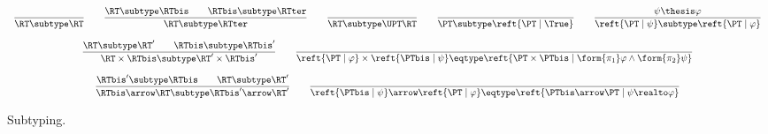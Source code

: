 \begin{figure}[t!]
\centering
\(
\begin{array}{c}
%
\dfrac{}
  {\RT \subtype \RT}
%
\qquad
%
\dfrac{\RT \subtype \RTbis
  \qquad
  \RTbis \subtype \RTter}
  {\RT \subtype \RTter}
%
\qquad
%
\dfrac{}
  {\RT \subtype \UPT\RT}
%
\qquad
%
\dfrac{}
  {\PT \subtype \reft{\PT \mid \True}}
%
\qquad
%
\dfrac{\psi \thesis \varphi}
  {\reft{\PT \mid \psi} \subtype \reft{\PT \mid \varphi}}
%
\\\\
%
\dfrac{\RT \subtype \RT'
  \qquad
  \RTbis \subtype \RTbis'}
  {\RT \times \RTbis \subtype \RT' \times \RTbis'}
%
\qquad
%
\dfrac{}{
  \reft{\PT \mid \varphi}
  \times
  \reft{\PTbis \mid \psi}
  \eqtype
  \reft{\PT \times \PTbis \mid \form{\pi_1}\varphi \land \form{\pi_2}\psi}}
%
\\\\
%
\dfrac{\RTbis' \subtype \RTbis
  \qquad
  \RT \subtype \RT'}
  {\RTbis \arrow \RT \subtype \RTbis' \arrow \RT'}
%
%
\qquad
%
\dfrac{}
  {\reft{\PTbis \mid \psi} \arrow \reft{\PT \mid \varphi}
  \eqtype
  \reft{\PTbis \arrow \PT \mid \psi \realto \varphi}}
%
% 
% 
% 
%
\end{array}
\)

\caption{Subtyping.%
\label{fig:reft:subtyping}}
\end{figure}


